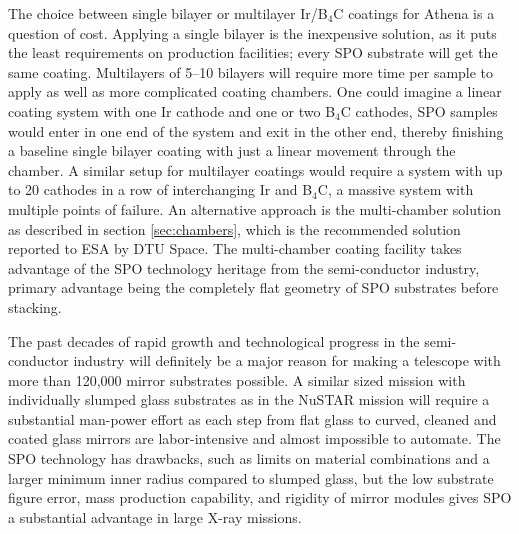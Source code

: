 The choice between single bilayer or multilayer Ir/B$_4$C coatings for Athena is a question of cost. Applying a single bilayer is the inexpensive solution, as it puts the least requirements on production facilities; every SPO substrate will get the same coating. Multilayers of 5--10 bilayers will require more time per sample to apply as well as more complicated coating chambers. One could imagine a linear coating system with one Ir cathode and one or two B$_4$C cathodes, SPO samples would enter in one end of the system and exit in the other end, thereby finishing a baseline single bilayer coating with just a linear movement through the chamber. A similar setup for multilayer coatings would require a system with up to 20 cathodes in a row of interchanging Ir and B$_4$C, a massive system with multiple points of failure. An alternative approach is the multi-chamber solution as described in section \ref{sec:chambers}, which is the recommended solution reported to ESA by DTU Space. The multi-chamber coating facility takes advantage of the SPO technology heritage from the semi-conductor industry, primary advantage being the completely flat geometry of SPO substrates before stacking.

The past decades of rapid growth and technological progress in the semi-conductor industry will definitely be a major reason for making a telescope with more than 120,000 mirror substrates possible. A similar sized mission with individually slumped glass substrates as in the NuSTAR mission will require a substantial man-power effort as each step from flat glass to curved, cleaned and coated glass mirrors are labor-intensive and almost impossible to automate. The SPO technology has drawbacks, such as limits on material combinations and a larger minimum inner radius compared to slumped glass, but the low substrate figure error, mass production capability, and rigidity of mirror modules gives SPO a substantial advantage in large X-ray missions.
